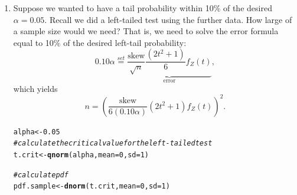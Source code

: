 \documentclass{article}\usepackage[]{graphicx}\usepackage[]{xcolor}
\makeatletter
\newcommand{\hlnum}[1]{\textcolor[rgb]{0.686,0.059,0.569}{#1}}%
\newcommand{\hlcom}[1]{\textcolor[rgb]{0.678,0.584,0.686}{\textit{#1}}}%
\newcommand{\hldef}[1]{\textcolor[rgb]{0.345,0.345,0.345}{#1}}%
\newcommand{\hlkwb}[1]{\textcolor[rgb]{0.69,0.353,0.396}{#1}}%
\newcommand{\hlkwc}[1]{\textcolor[rgb]{0.333,0.667,0.333}{#1}}%
\newcommand{\hlkwd}[1]{\textcolor[rgb]{0.737,0.353,0.396}{\textbf{#1}}}%
\newenvironment{kframe}{%
 \def\at@end@of@kframe{}%
 \ifinner\ifhmode%
  \def\at@end@of@kframe{\end{minipage}}%
  \begin{minipage}{\columnwidth}%
 \fi\fi%
 \def\FrameCommand##1{\hskip\@totalleftmargin \hskip-\fboxsep
 \colorbox{shadecolor}{##1}\hskip-\fboxsep
     \hskip-\linewidth \hskip-\@totalleftmargin \hskip\columnwidth}%
 \MakeFramed {\advance\hsize-\width
   \@totalleftmargin\z@ \linewidth\hsize
   \@setminipage}}%
 {\par\unskip\endMakeFramed%
 \at@end@of@kframe}
\newenvironment{knitrout}{}{} %
\makeatother
\begin{document}
\begin{enumerate}
\begin{enumerate}
  \item Suppose we wanted to have a tail probability within 10\% of the desired
  $\alpha=0.05$. Recall we did a left-tailed test using the further data.
  How large of a sample size would we need? That is, we need
  to solve the error formula equal to 10\% of the desired left-tail probability:
  \[0.10 \alpha  \stackrel{set}{=} \underbrace{\frac{\text{skew}}{\sqrt{n}} \frac{(2t^2+1)}{6} f_Z(t)}_{\textrm{error}},\]
  which yields
  \[ n = \left(\frac{\text{skew}}{6(0.10\alpha)} (2t^2 + 1) f_Z(t)\right)^2.\]
\begin{knitrout}\scriptsize
{}\color{fgcolor}\begin{kframe}
\begin{alltt}
\hldef{alpha} \hlkwb{<-} \hlnum{0.05}
\hlcom{#calculate the critical value for the left-tailed test}
\hldef{t.crit} \hlkwb{<-} \hlkwd{qnorm}\hldef{(alpha,} \hlkwc{mean} \hldef{=} \hlnum{0}\hldef{,} \hlkwc{sd} \hldef{=} \hlnum{1}\hldef{)}

\hlcom{#calculate pdf}
\hldef{pdf.sample} \hlkwb{<-} \hlkwd{dnorm}\hldef{(t.crit,} \hlkwc{mean} \hldef{=} \hlnum{0}\hldef{,} \hlkwc{sd} \hldef{=} \hlnum{1}\hldef{)}


\end{alltt}
\end{kframe}
\end{knitrout}
\end{enumerate}
\end{enumerate}
\end{document}
